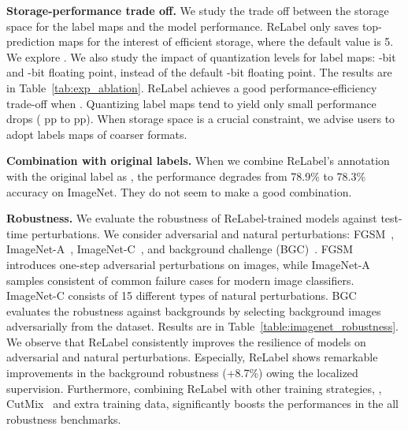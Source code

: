 \documentclass[final]{cvpr}
\newcommand\ours{{{\mbox{ReLabel}}}\xspace}
\begin{document}
 

\noindent\textbf{Storage-performance trade off.}
We study the trade off between the storage space for the label maps and the model performance.
\ours only saves top- prediction maps for the interest of efficient storage, where the default  value is 5. We explore . We also study the impact of quantization levels for label maps: -bit and -bit floating point, instead of the default -bit floating point.
The results are in Table~\ref{tab:exp_ablation}.
\ours achieves a good performance-efficiency trade-off when .
Quantizing label maps tend to yield only small performance drops ( pp to  pp).
When storage space is a crucial constraint, we advise users to adopt labels maps of coarser formats.


\noindent\textbf{Combination with original labels.}
When we combine \ours's annotation  with the original label  as ,
the performance degrades from 78.9\% to 78.3\% accuracy on ImageNet. 
They do not seem to make a good combination.


\noindent\textbf{Robustness.}
We evaluate the robustness of \ours-trained models against test-time perturbations. We consider adversarial and natural perturbations: FGSM~\cite{fgsm}, ImageNet-A~\cite{imagenet-a}, ImageNet-C~\cite{imagenet-c}, and background challenge (BGC)~\cite{bgc}. FGSM introduces one-step adversarial perturbations on images, while ImageNet-A samples consistent of common failure cases for modern image classifiers. ImageNet-C consists of 15 different types of natural perturbations.
BGC evaluates the robustness against backgrounds by selecting background images adversarially from the dataset.
Results are in Table~\ref{table:imagenet_robustness}.
We observe that \ours consistently improves the resilience of models on adversarial and natural perturbations. Especially, \ours shows remarkable improvements in the background robustness (+8.7\%) owing the localized supervision.
Furthermore, combining \ours with other training strategies, \eg, CutMix~\cite{yun2019cutmix} and extra training data, significantly boosts the performances in the all robustness benchmarks.

\newcommand{\snum}[1]{{\small #1}}
\end{document}
